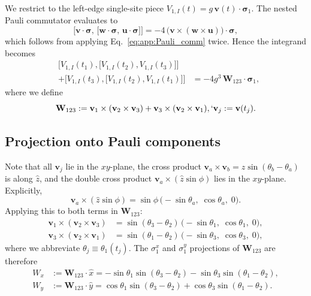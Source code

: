 \documentclass[aps,prb,reprint,twocolumn,amsmath,amssymb,citeautoscript]{revtex4-2}
\begin{document}
We restrict to the left-edge single-site piece
$V_{1,I}(t)=g\,\mathbf{v}(t)\cdot\boldsymbol{\sigma}_1$.
The nested Pauli commutator evaluates to
\begin{equation}
\bigl[\mathbf{v}\cdot\boldsymbol{\sigma},\,
\bigl[\mathbf{w}\cdot\boldsymbol{\sigma},\,
\mathbf{u}\cdot\boldsymbol{\sigma}\bigr]\bigr]
=-4\,\bigl(\mathbf{v}\times(\mathbf{w}\times\mathbf{u})\bigr)
\cdot\boldsymbol{\sigma},
\label{eq:app:Pauli_nested}
\end{equation}
which follows from applying Eq.~\eqref{eq:app:Pauli_comm} twice.
Hence the integrand becomes
\begin{equation}
\begin{aligned}
    &\bigl[V_{1,I}(t_1),\bigl[V_{1,I}(t_2),V_{1,I}(t_3)\bigr]\bigr]\\
&+\bigl[V_{1,I}(t_3),\bigl[V_{1,I}(t_2),V_{1,I}(t_1)\bigr]\bigr]
&=-4g^3\,
\mathbf{W}_{123}\cdot\boldsymbol{\sigma}_1,
\end{aligned}
\label{eq:app:edge_integrand}
\end{equation}
where we define
\begin{equation}
\mathbf{W}_{123}
:=\mathbf{v}_1\times(\mathbf{v}_2\times\mathbf{v}_3)
+\mathbf{v}_3\times(\mathbf{v}_2\times\mathbf{v}_1),`
\mathbf{v}_j:=\mathbf{v}(t_j).
\label{eq:app:edge_W}
\end{equation}


\subsection{Projection onto Pauli components}
\label{app:edge:projection}

Note that all $\mathbf{v}_j$ lie in the $xy$-plane, the cross product
$\mathbf{v}_a\times\mathbf{v}_b=\hat{z}\sin(\theta_b-\theta_a)$
is along $\hat{z}$, and the double cross product
$\mathbf{v}_a\times(\hat{z}\sin\phi)$ lies in the $xy$-plane.
Explicitly,
\begin{equation}
\mathbf{v}_a\times(\hat{z}\sin\phi)
=\sin\phi\,\bigl(-\sin\theta_a,\;\cos\theta_a,\;0\bigr).
\label{eq:app:edge_double_cross}
\end{equation}
Applying this to both terms in $\mathbf{W}_{123}$:
\begin{align}
\mathbf{v}_1\times(\mathbf{v}_2\times\mathbf{v}_3)
&=\sin(\theta_3-\theta_2)\,
\bigl(-\sin\theta_1,\;\cos\theta_1,\;0\bigr),
\nonumber\\
\mathbf{v}_3\times(\mathbf{v}_2\times\mathbf{v}_1)
&=\sin(\theta_1-\theta_2)\,
\bigl(-\sin\theta_3,\;\cos\theta_3,\;0\bigr),
\label{eq:app:edge_Wterms}
\end{align}
where we abbreviate $\theta_j\equiv\theta_1(t_j)$.
The $\sigma_1^x$ and $\sigma_1^y$ projections of $\mathbf{W}_{123}$
are therefore
\begin{align}
W_x&:=\mathbf{W}_{123}\cdot\hat{x}
=-\sin\theta_1\sin(\theta_3-\theta_2)
-\sin\theta_3\sin(\theta_1-\theta_2),
\label{eq:app:edge_Wx}\\[4pt]
W_y&:=\mathbf{W}_{123}\cdot\hat{y}
=\cos\theta_1\sin(\theta_3-\theta_2)
+\cos\theta_3\sin(\theta_1-\theta_2).
\label{eq:app:edge_Wy}
\end{align}
\end{document}
